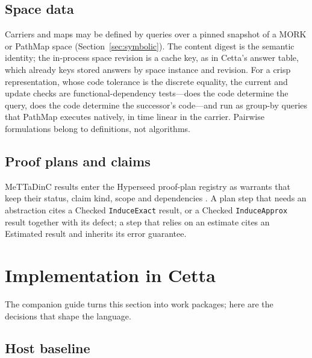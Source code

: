 \documentclass[11pt]{article}
\newcommand{\code}[1]{\texttt{#1}}
\theoremstyle{definition}
\theoremstyle{plain}
\begin{document}
\subsection{Space data}

Carriers and maps may be defined by queries over a pinned snapshot of a MORK or PathMap space
(Section~\ref{sec:symbolic}). The content digest is the semantic identity; the in-process space
revision is a cache key, as in Cetta's answer table, which already keys stored answers by space
instance and revision. For a crisp representation, whose code tolerance is the discrete equality,
the current and update checks are functional-dependency tests---does the code determine the query,
does the code determine the successor's code---and run as group-by
queries that PathMap executes natively, in time linear in the carrier. Pairwise formulations belong
to definitions, not algorithms.

\subsection{Proof plans and claims}

MeTTaDinC results enter the Hyperseed proof-plan registry as warrants that keep their status, claim
kind, scope and dependencies \cite{proofplans}. A plan step that needs an abstraction cites a Checked
\code{InduceExact} result, or a Checked \code{InduceApprox} result together with its defect; a step
that relies on an estimate cites an Estimated result and inherits its error guarantee.

\section{Implementation in Cetta}\label{sec:cetta}

The companion guide turns this section into work packages; here are the decisions that shape the
language.

\subsection{Host baseline}
\end{document}
